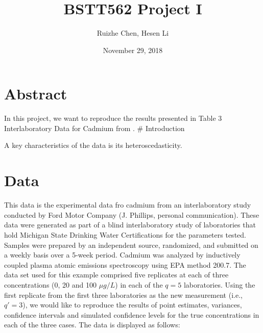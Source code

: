 \documentclass[12pt,]{article}
\title{BSTT562 Project I}
\author{Ruizhe Chen, Hesen Li}
\date{November 29, 2018}
\begin{document}
\maketitle

\section{Abstract}\label{abstract}

In this project, we want to reproduce the results presented in Table 3
Interlaboratory Data for Cadmium from \citet{Bhaumik2005}. \#
Introduction

A key characteristics of the data is its heteroscedasticity.

\section{Data}\label{data}

This data is the experimental data fro cadmium from an interlaboratory
study conducted by Ford Motor Company (J. Phillips, personal
communication). These data were generated as part of a blind
interlaboratory study of laboratories that hold Michigan State Drinking
Water Certifications for the parameters tested. Samples were prepared by
an independent source, randomized, and submitted on a weekly basis over
a 5-week period. Cadmium was analyzed by inductively coupled plasma
atomic emissions spectroscopy using EPA method 200.7. The data set used
for this example comprised five replicates at each of three
concentrations (0, 20 and 100 \(\mu g/L\)) in each of the \(q = 5\)
laboratories. Using the first replicate from the first three
laboratories as the new measurement (i.e., \(q' = 3\)), we would like to
reproduce the results of point estimates, variances, confidence
intervals and simulated confidence levels for the true concentrations in
each of the three cases. The data is displayed as follows:
\end{document}
